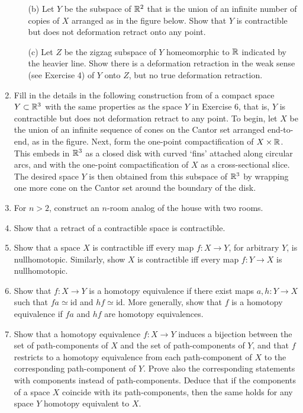 \begin{enumerate}
\begin{enumerate}
\item[(b)] Let $Y$ be the subspace of $\R^2$ that is the union of an infinite number
of copies of $X$ arranged as in the figure below. Show that $Y$ is contractible but
does not deformation retract onto any point.



\item[(c)] Let $Z$ be the zigzag subspace of $Y$ homeomorphic to $\R$ indicated by
the heavier line. Show there is a deformation retraction in the weak sense (see
Exercise 4) of $Y$ onto $Z$, but no true deformation retraction.
\end{enumerate}

\item Fill in the details in the following construction from \cite{Edwards1999} of a
compact space $Y \subset \mathbb{R}^3$ with the same properties as the space $Y$ in Exercise 6,
that is, $Y$ is contractible but does not deformation retract to any point. To begin, let
$X$ be the union of an infinite sequence of cones on the Cantor set arranged
end-to-end, as in the figure. Next, form the one-point compactification of
$X \times \mathbb{R}$. This embeds in $\mathbb{R}^3$ as a closed disk with curved `fins' attached along
circular arcs, and with the one-point compactification of $X$ as a cross-sectional slice.
The desired space $Y$ is then obtained from this subspace of $\mathbb{R}^3$ by wrapping one
more cone on the Cantor set around the boundary of the disk.



\item For $n > 2$, construct an $n$-room analog of the house with two rooms.

\item Show that a retract of a contractible space is contractible.

\item Show that a space $X$ is contractible iff every map $f : X \to Y$, for arbitrary
$Y$, is nullhomotopic. Similarly, show $X$ is contractible iff every map $f : Y \to X$ is
nullhomotopic.

\item Show that $f : X \to Y$ is a homotopy equivalence if there exist maps
$a, h : Y \to X$ such that $fa \simeq \mathrm{id}$ and $hf \simeq \mathrm{id}$. More generally, show that
$f$ is a homotopy equivalence if $fa$ and $hf$ are homotopy equivalences.

\item Show that a homotopy equivalence $f : X \to Y$ induces a bijection between
the set of path-components of $X$ and the set of path-components of $Y$, and that $f$
restricts to a homotopy equivalence from each path-component of $X$ to the
corresponding path-component of $Y$. Prove also the corresponding statements with
components instead of path-components. Deduce that if the components of a space
$X$ coincide with its path-components, then the same holds for any space $Y$
homotopy equivalent to $X$.


\end{enumerate}
